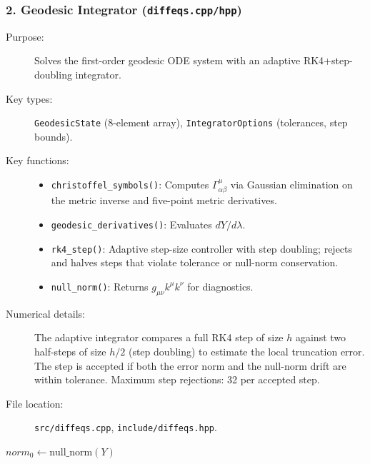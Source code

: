 \documentclass[11pt,twoside]{article}
\begin{document}
\subsubsection{2. Geodesic Integrator (\texttt{diffeqs.cpp/hpp})}

\begin{description}
\item[Purpose:] Solves the first-order geodesic ODE system with an adaptive
RK4+step-doubling integrator.
\item[Key types:] \texttt{GeodesicState} (8-element array),
\texttt{IntegratorOptions} (tolerances, step bounds).
\item[Key functions:]
\begin{itemize}
\item \texttt{christoffel\_symbols()}: Computes $\Gamma^\mu_{\alpha\beta}$ via
Gaussian elimination on the metric inverse and five-point metric derivatives.
\item \texttt{geodesic\_derivatives()}: Evaluates $dY/d\lambda$.
\item \texttt{rk4\_step()}: Adaptive step-size controller with step doubling;
rejects and halves steps that violate tolerance or null-norm conservation.
\item \texttt{null\_norm()}: Returns $g_{\mu\nu}k^\mu k^\nu$ for diagnostics.
\end{itemize}
\item[Numerical details:] The adaptive integrator compares a full RK4 step of size
$h$ against two half-steps of size $h/2$ (step doubling) to estimate the local
truncation error. The step is accepted if both the error norm and the null-norm
drift are within tolerance. Maximum step rejections: 32 per accepted step.
\item[File location:] \texttt{src/diffeqs.cpp}, \texttt{include/diffeqs.hpp}.
\end{description}

\begin{algorithm}[H]
\SetAlgoLined
{}
$norm_0 \leftarrow \text{null\_norm}(Y)$\;
\;
\caption{Adaptive RK4 step with null-norm guard}
\end{algorithm}
\end{document}
